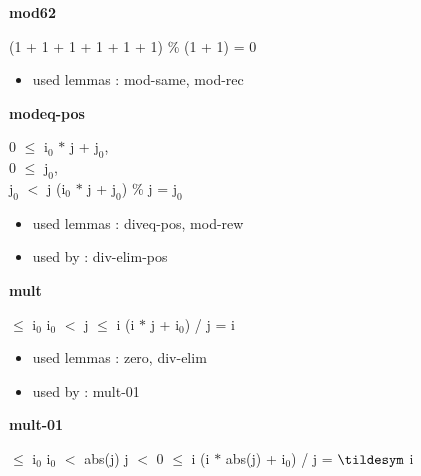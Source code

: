 \documentclass[a4paper]{article}
\begin{document}
\medskip

\bigskip

{\large\bf mod62}

\medskip

 \Fol (1 + 1 + 1 + 1 + 1 + 1) \% (1 + 1) = 0

\begin{itemize}


\item       used lemmas  : mod-same, mod-rec

\end{itemize}

\medskip

\bigskip

{\large\bf modeq-pos}

\medskip

0 $\le$ $\mbox{i}_{0}$ $*$ j + $\mbox{j}_{0}$, \\
0 $\le$ $\mbox{j}_{0}$, \\
$\mbox{j}_{0}$ $<$ j \Fol ($\mbox{i}_{0}$ $*$ j + $\mbox{j}_{0}$) \% j = $\mbox{j}_{0}$

\begin{itemize}


\item       used lemmas  : diveq-pos, mod-rew
\item       used by      : div-elim-pos

\end{itemize}

\medskip

\bigskip

{\large\bf mult}

\medskip

  $\le$ $\mbox{i}_{0}$ \And $\mbox{i}_{0}$ $<$ j  $\le$ i \Imp (i $*$ j + $\mbox{i}_{0}$) / j = i

\begin{itemize}


\item       used lemmas  : zero, div-elim
\item       used by      : mult-01

\end{itemize}

\medskip

\bigskip

{\large\bf mult-01}

\medskip

  $\le$ $\mbox{i}_{0}$ \And $\mbox{i}_{0}$ $<$ abs(j) \And j $<$ 0  $\le$ i \Imp (i $*$ abs(j) + $\mbox{i}_{0}$) / j = $\tildesym$ i
\end{document}
